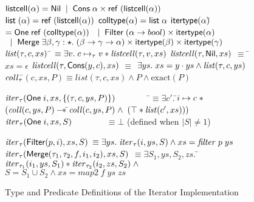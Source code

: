 \begin{figure}
\mbox{}
\begin{specification}
$\mathsf{listcell}(\alpha) = \mathsf{Nil} \;\;|\;\; \mathsf{Cons}\; \alpha \times \mathsf{ref}\;(\mathsf{listcell}(\alpha))$ \\
\> $\mathsf{list}\;{(}\alpha) = \mathsf{ref}\;(\mathsf{listcell}{(\alpha)})$
\nextline
$\mathsf{colltype}(\alpha) = \mathsf{list}\;{\alpha}$ 
$\mathsf{itertype}{(\alpha)} $\=$=  \mathsf{One}\;\mathsf{ref}\;(\mathsf{colltype}{(\alpha)})$ \nextline
                       \>$ \;\;|\;\; 
                          \mathsf{Filter}\;(\alpha \to bool) \times \mathsf{itertype}{(\alpha)}$ \nextline
                       \>$\;\;|\;\; \mathsf{Merge}\; \exists \beta, \gamma:\star.\; (\beta \to \gamma \to \alpha) \times \mathsf{itertype}(\beta) \times \mathsf{itertype}(\gamma)$
$\mathit{list}(\tau, c, xs)$ \qquad\qquad\qquad\= $\equiv \exists v.\; c \mapsto_\tau v * \mathit{listcell}(\tau, v, xs)$ 
\nextline
$\mathit{listcell}(\tau, \mathsf{Nil}, xs)$ \> $\equiv$ \= $xs = \epsilon$ 
\nextline
$\mathit{listcell}(\tau, \mathsf{Cons}(y,c), xs)$ \> $\equiv$ \> 
   $\exists ys.\; xs = y\cdot ys \land \mathit{list}(\tau, c, ys)$ 
$\mathit{coll}_\tau$\=$(c, xs, P) \equiv list(\tau, c, xs) \land P \land \mbox{exact}(P)$ 

$\mathit{iter}_\tau(\mathsf{One}\;i, xs, \{{(\tau, c, ys, P)}\}) \qquad\qquad$\=$\equiv \exists c'.\;$\=$i \mapsto c \;*$ \nextline
                                                                   \>                      \>$(\mathit{coll}(c, ys, P) -\!\!*\, $\=$\mathit{coll}(c, ys, P) \;\land $\nextline
                                                                   \>                      \>                             \>$(\top * \mathit{list}(c', xs)))$ 
\nextline
$\mathit{iter}_\tau(\mathsf{One}\;i, xs, S) \qquad\qquad$\>$\equiv \bot$ (defined when $|S| \not= 1$)
\nextline

$\mathit{iter}_\tau(\mathsf{Filter}(p, i), xs, S)$ \>$\equiv 
  \exists ys.\; \mathit{iter}_\tau(i, ys, S) \land xs = \mathit{filter}\;p\;ys$ 
\nextline
$\mathit{iter}_{\tau}(\mathsf{Merge}(\tau_1, \tau_2, f, i_1, i_2), xs, S)$ \>$\equiv 
  \exists S_1, ys, S_2, zs.$ 
\nextline
  \> \qquad \= $\mathit{iter}_{\tau_1}(i_1, ys, S_1) * \mathit{iter}_{\tau_2}(i_2, zs, S_2) \;\land$
\nextline \> \>$S = S_1 \cup S_2 \land xs = \mathit{map2}\;f\;ys\;zs$ 
\end{specification}
\caption{Type and Predicate Definitions of the Iterator Implementation}
\label{iterator-pred-impl}
\end{figure}

